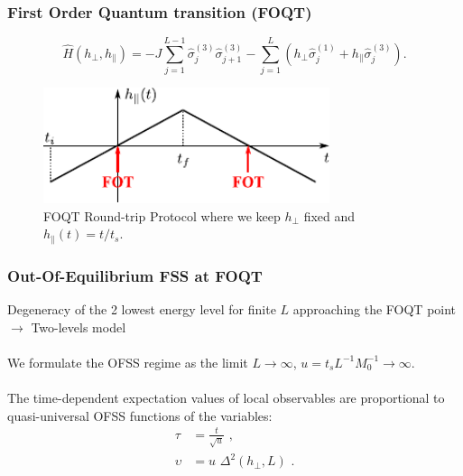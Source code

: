 \begin{frame}
	\frametitle{First Order Quantum transition (FOQT)}

    \begin{equation}
        \label{eq:model}
        \hat{H}(h_\perp,h_\parallel)=-J\sum_{j=1}^{L-1} \hat\sigma^{(3)}_j\hat\sigma^{(3)}_{j+1} -\sum_{j=1}^L (h_\perp\hat\sigma^{(1)}_j + h_\parallel \hat\sigma^{(3)}_j).   
    \end{equation}
        
    \begin{center}
		\begin{figure}
					   \includegraphics[width=8.4cm]{paper/protocol_foqt.pdf}
					  \caption{ FOQT Round-trip Protocol where we keep $h_\perp$ fixed and $h_\parallel (t) = t / t_s$.}
					\label{protocol_foqt}
		\end{figure}
	\end{center}
	
	
	
\end{frame}

\begin{frame}
    \frametitle{Out-Of-Equilibrium FSS at FOQT }

    Degeneracy of the 2 lowest energy level for finite $L$ approaching the FOQT point $\longrightarrow$ Two-levels model\\
    $ $\\

    We formulate the OFSS regime as the limit $L \to \infty$, $u = t_s L^{-1} M_0^{-1} \to \infty$.\\
    $ $\\
    The time-dependent expectation values of local observables are proportional to quasi-universal OFSS functions of the variables:
    \begin{align}
        \tau &= \frac{t}{\sqrt{u}} \,\,,\\
        \upsilon &= u \,\,\Delta^2(h_\perp, L) \,\,. 
    \end{align}

\end{frame}

